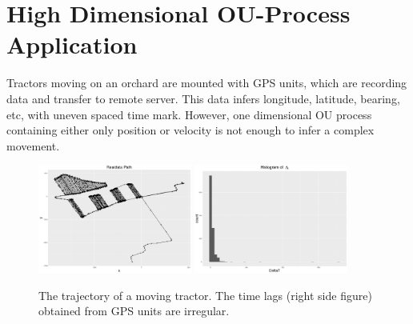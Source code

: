 \section{High Dimensional OU-Process Application}\label{SectionHighDimensionalOU}

Tractors moving on an orchard are mounted with GPS units, which are recording data and transfer to remote server. This data infers longitude, latitude, bearing, etc, with uneven spaced time mark. However, one dimensional OU process containing either only position or velocity is not enough to infer a complex movement. 

\begin{figure}[h]
\centering
\includegraphics[width=0.45\textwidth]{Chapters/05MCMCOU/plots/realdatapath.pdf}
\includegraphics[width=0.45\textwidth]{Chapters/05MCMCOU/plots/realdatahistdeltaT.pdf}
\caption{The trajectory of a moving tractor. The time lags (right side figure) obtained from GPS units are irregular.}
\label{realdatareview}
\end{figure}

